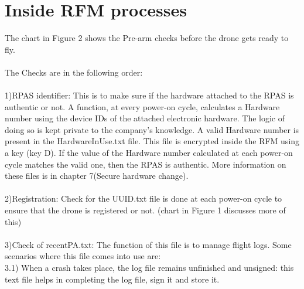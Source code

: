\documentclass[18pt]{article}
\begin{document}
\newpage
\section{Inside RFM processes}
The chart in Figure 2 shows the Pre-arm checks before the drone gets ready to fly.  \\
\\
The Checks are in the  following order:\\
\\
1)RPAS identifier: This is to make sure if the hardware attached to the RPAS is authentic or not. A function, at every power-on cycle, calculates a Hardware number using the device IDs of the attached electronic hardware. The logic of doing so is kept private to the company's knowledge. A valid Hardware number is present in the HardwareInUse.txt file.  This file is encrypted inside the RFM using a key (key D). If the value of the Hardware number calculated at each power-on cycle matches the valid one, then the RPAS is authentic. More information on these files is in chapter 7(Secure hardware change).\\
\\
2)Registration: Check for the UUID.txt file is done at each power-on cycle to ensure that the drone is registered or not. (chart in Figure 1 discusses more of this)\\
\\
3)Check of recentPA.txt: The function of this file is to manage flight logs. Some scenarios where this file comes into use are:\\

3.1) When a crash takes place,  the log file remains unfinished and unsigned: this text file helps in completing the log file, sign it and store it.\\
\end{document}
